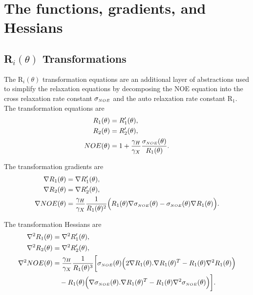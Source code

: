 
\chapter{The functions, gradients, and Hessians}




\section{R$_i(\theta)$ Transformations}

The R$_i(\theta)$ transformation equations are an additional layer of abstractions used to simplify the relaxation equations by decomposing the NOE equation into the cross relaxation rate constant $\sigma_{\scriptscriptstyle NOE}$ and the auto relaxation rate constant R$_1$.  The transformation equations are
\begin{align}
    R_1(\theta) & = R_1'(\theta), \label{eq: Ri trans: R1} \\
    R_2(\theta) & = R_2'(\theta), \label{eq: Ri trans: R2} \\
    NOE(\theta) & = 1 + \frac{\gamma_H}{\gamma_X} \frac{\sigma_{\scriptscriptstyle NOE}(\theta)}{R_1(\theta)}. \label{eq: Ri trans: NOE}
\end{align}

\noindent The transformation gradients are
\begin{align}
    \nabla R_1(\theta) & = \nabla R_1'(\theta), \label{eq: Ri trans: dR1} \\
    \nabla R_2(\theta) & = \nabla R_2'(\theta), \label{eq: Ri trans: dR2} \\
    \nabla NOE(\theta) & = \frac{\gamma_H}{\gamma_X} \frac{1}{R_1(\theta)^2} \Big(
        R_1(\theta) \nabla \sigma_{\scriptscriptstyle NOE}(\theta) - \sigma_{\scriptscriptstyle NOE}(\theta) \nabla R_1(\theta)
    \Big). \label{eq: Ri trans: dNOE}
\end{align}

\noindent The transformation Hessians are
\begin{align}
    \nabla^2 R_1(\theta) & = \nabla^2 R_1'(\theta), \label{eq: Ri trans: d2R1} \\
    \nabla^2 R_2(\theta) & = \nabla^2 R_2'(\theta), \label{eq: Ri trans: d2R2} \\
    \nabla^2 NOE(\theta) & = \frac{\gamma_H}{\gamma_X} \frac{1}{R_1(\theta)^3} \bigg[
        \sigma_{\scriptscriptstyle NOE}(\theta) \Big( 2 \nabla R_1(\theta) . \nabla R_1(\theta)^T - R_1(\theta) \nabla^2 R_1(\theta) \Big) \nonumber\\
        & \quad - R_1(\theta) \Big( \nabla \sigma_{\scriptscriptstyle NOE}(\theta) . \nabla R_1(\theta)^T - R_1(\theta) \nabla^2 \sigma_{\scriptscriptstyle NOE}(\theta) \Big)
    \bigg]. \label{eq: Ri trans: d2NOE}
\end{align}



